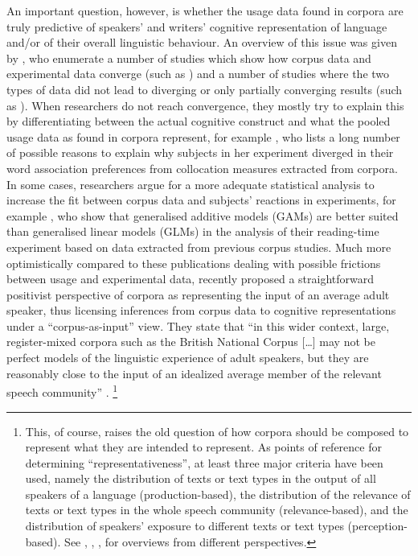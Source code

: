 An important question, however, is whether the usage data found in corpora are truly predictive of speakers' and writers' cognitive representation of language and\slash or of their overall linguistic behaviour.
An overview of this issue was given by \cite{NewmanSorensenduncan2015}, who enumerate a number of studies which show how corpus data and experimental data converge (such as \citealp{DurrantDoherty2010,BresnanEa2007,GriesWulff2005,GriesEa2005}) and a number of studies where the two types of data did not lead to diverging or only partially converging results (such as \citealp{ArppeJaervikivi2007,Dabrowska2014,Mollin2009}).
When researchers do not reach convergence, they mostly try to explain this by differentiating between the actual cognitive construct and what the pooled usage data as found in corpora represent, for example \citet[411]{Dabrowska2014}, who lists a long number of possible reasons to explain why subjects in her experiment diverged in their word association preferences from collocation measures extracted from corpora.
In some cases, researchers argue for a more adequate statistical analysis to increase the fit between corpus data and subjects' reactions in experiments, for example \cite{DivjakEa2016}, who show that generalised additive models (GAMs) are better suited than generalised linear models (GLMs) in the analysis of their reading-time experiment based on data extracted from previous corpus studies.
Much more optimistically compared to these publications dealing with possible frictions between usage and experimental data, \cite{StefanowitschFlach2016} recently proposed a straightforward positivist perspective of corpora as representing the input of an average adult speaker, thus licensing inferences from corpus data to cognitive representations under a ``corpus-as-input'' view.
They state that ``in this wider context, large, register-mixed corpora such as the British National Corpus [\ldots] may not be perfect models of the linguistic experience of adult speakers, but they are reasonably close to the input of an idealized average member of the relevant speech community'' \citep[104]{StefanowitschFlach2016}.%
\footnote{This, of course, raises the old question of how corpora should be composed to represent what they are intended to represent.
As points of reference for determining ``representativeness'', at least three major criteria have been used, namely the distribution of texts or text types in the output of all speakers of a language (production-based), the distribution of the relevance of texts or text types in the whole speech community (relevance-based), and the distribution of speakers' exposure to different texts or text types (perception-based).
See \citet{Biber1993}, \citet{MceneryEa2006}, \citet{Leech2007}, \citet{Hunston2008} for overviews from different perspectives.}
